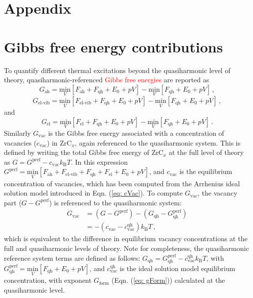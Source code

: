 \documentclass[twocolumn,american,aps,prb,showpacs,showkeys,amsmath,amssymb,superscriptaddress,a4]{revtex4-1}
\begin{document}
%




\appendix

\section*{Appendix\label{sec:Appendix}}

\section*{Gibbs free energy contributions\label{sec: gibbsFreeEnergies}}
To quantify different thermal excitations beyond the quasiharmonic level of theory, quasiharmonic-referenced  \textcolor{red}{Gibbs free energies} are reported as
\[
G_{\text{ah}}=\underset{V}{\text{min}}\left[F_{\text{ah}}+F_{\text{qh}}+E_{0}+pV\right]-\underset{V}{\text{min}}\left[F_{\text{qh}}+E_{0}+pV\right]\,,
\]
\[
G_{\text{el-vib}}=\underset{V}{\text{min}}\left[F_{\text{el-vib}}+F_{\text{qh}}+E_{0}+pV\right]-\underset{V}{\text{min}}\left[F_{\text{qh}}+E_{0}+pV\right]\,,
\]
and 
\[
G_{\text{el}}=\underset{V}{\text{min}}\left[F_{\text{el}}+F_{\text{qh}}+E_{0}+pV\right]-\underset{V}{\text{min}}\left[F_{\text{qh}}+E_{0}+pV\right]\,.
\]
Similarly $G_{\text{vac}}$ is the Gibbs free energy associated with a concentration of vacancies ($c_\text{vac}$) in ZrC$_x$, again referenced to the quasiharmonic system. This is defined by writing the total Gibbs free energy of ZrC$_x$ at the full level of theory as $G=G^{\text{perf}}-c_{\text{vac}}k_\text{B}T$. In this expression $G^{\text{perf}}=\underset{V}{\text{min}}\left[F_{\text{ah}}+F_{\text{el-vib}}+F_{\text{qh}}+F_{\text{el}}+E_{0}+pV\right]$, and $c_\text{vac}$ is the equilibrium concentration of vacancies, which has been computed from the Arrhenius ideal solution model introduced in Eqn. (\ref{eq: cVac}). To compute $G_{\text{vac}}$, the vacancy part ($G-G^{\text{perf}}$) is referenced to the quasiharmonic system:
\begin{align*}
G_{\text{vac}} & =\left(G-G^{\text{perf}}\right)-\left(G_{\text{qh}}^{\,}-G_{\text{qh}}^{\text{perf}}\right)\\
 & =-\left(c_{\text{vac}}-c_{\text{vac}}^{\text{qh}}\right)k_\text{B}T\,,
\end{align*}
which is equivalent to the difference in equilibrium vacancy concentrations at the full and quasiharmonic levels of theory. Note for completeness, the quasiharmonic reference system terms are defined as follows: $G_{\text{qh}}=G_{\text{qh}}^{\text{perf}}-c_{\text{vac}}^{\text{qh}}k_\text{B}T$, with $G_{\text{qh}}^{\text{perf}}=\underset{V}{\text{min}}\left[F_{\text{qh}}+E_{0}+pV\right]$, and $c_{\text{vac}}^{\text{qh}}$ is the ideal solution model equilibrium concentration, with exponent $G_\text{form}$ (Eqn. (\ref{eq: gForm})) calculated at the quasiharmonic level.
\end{document}
